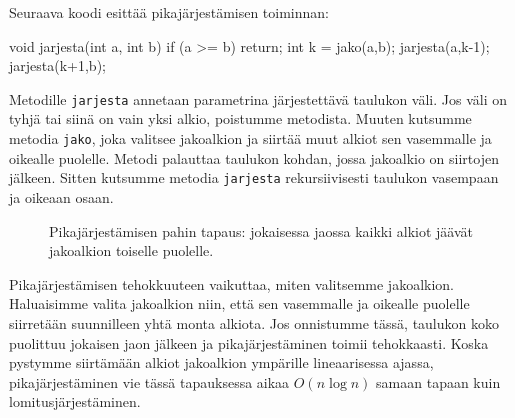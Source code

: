 Seuraava koodi esittää pikajärjestämisen toiminnan:

\begin{code}
void jarjesta(int a, int b) {
    if (a >= b) return;
    int k = jako(a,b);
    jarjesta(a,k-1);
    jarjesta(k+1,b);
}
\end{code}

Metodille \texttt{jarjesta} annetaan parametrina järjestettävä
taulukon väli.
Jos väli on tyhjä tai siinä on vain yksi alkio,
poistumme metodista.
Muuten kutsumme metodia \texttt{jako}, joka valitsee jakoalkion
ja siirtää muut alkiot sen vasemmalle ja oikealle puolelle.
Metodi palauttaa taulukon kohdan, jossa jakoalkio on siirtojen jälkeen.
Sitten kutsumme metodia \texttt{jarjesta} rekursiivisesti
taulukon vasempaan ja oikeaan osaan.

\begin{figure}
\center
{}
\caption{Pikajärjestämisen pahin tapaus: jokaisessa jaossa kaikki
alkiot jäävät jakoalkion toiselle puolelle.}
\label{fig:pikpah}
\end{figure}

Pikajärjestämisen tehokkuuteen vaikuttaa, miten valitsemme jakoalkion.
Haluaisimme valita jakoalkion niin, että sen vasemmalle ja oikealle
puolelle siirretään suunnilleen yhtä monta alkiota.
Jos onnistumme tässä, taulukon koko puolittuu jokaisen jaon jälkeen
ja pikajärjestäminen toimii tehokkaasti.
Koska pystymme siirtämään alkiot jakoalkion ympärille
lineaarisessa ajassa, pikajärjestäminen vie tässä tapauksessa aikaa
$O(n \log n)$ samaan tapaan kuin lomitusjärjestäminen.

